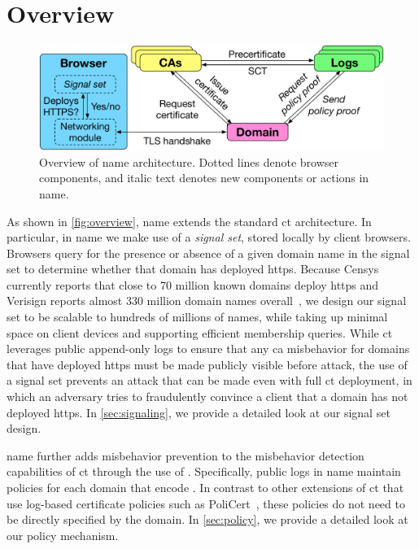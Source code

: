 \section{Overview}
\label{sec:overview}

\begin{figure}
  \centering
  \includegraphics[width=\linewidth]{fig/overview}
  \caption{Overview of \ac{name} architecture. Dotted lines denote browser
  components, and italic text denotes new components or actions in \ac{name}.}
  \label{fig:overview}
\end{figure}

As shown in \autoref{fig:overview}, \ac{name} extends the standard \ac{ct}
architecture. In particular, in \ac{name} we make use of a \emph{signal set},
stored locally by client browsers. Browsers query for the presence or absence of
a given domain name in the signal set to determine whether that domain has
deployed \acs{https}. Because Censys~\cite{durumeric2015search} currently
reports that close to 70 million known domains deploy \ac{https} and Verisign
reports almost 330 million domain names overall~\cite{dnib-14-1}, we design our
signal set to be scalable to hundreds of millions 
of names, while taking up minimal space on client devices and supporting
efficient membership queries. While \ac{ct} leverages public append-only logs to
ensure that any \ac{ca} misbehavior for domains that have deployed \ac{https}
must be made publicly visible before  attack, the use of a signal set
prevents an attack that can be made even with full \ac{ct} deployment, in which
an adversary tries to fraudulently convince a client that a domain has not
deployed \ac{https}. In \autoref{sec:signaling}, we provide a detailed
look at our signal set design.

\ac{name} further adds misbehavior prevention to the misbehavior detection
capabilities of \ac{ct} through the use of . Specifically, public logs in \ac{name} maintain
  policies for each domain that encode . In contrast to other extensions of \ac{ct}
that use log-based certificate policies such as
PoliCert~\cite{szalachowski2014policert}, these policies do not need to be
directly specified by the domain.  In \autoref{sec:policy}, we provide a detailed look at our policy
mechanism.

